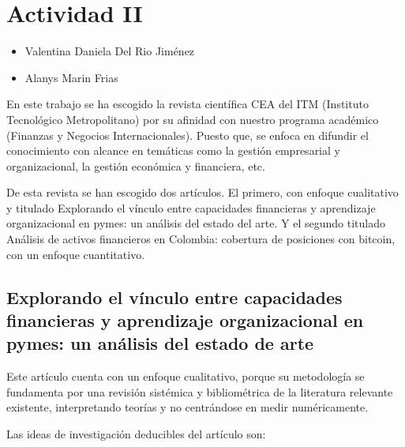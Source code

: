 \documentclass[letterpaper, 12pt]{report}
\begin{document}
\chapter*{Actividad II}

\noindent\makebox[\linewidth]{\rule{\textwidth}{0.2pt}}

\begin{itemize}[label=$\triangleright$]
      \item Valentina Daniela Del Rio Jiménez
      \item Alanys Marin Frias
\end{itemize}

\noindent\makebox[\linewidth]{\rule{\textwidth}{0.2pt}}

\nocite{*}

En este trabajo se ha escogido la revista científica CEA del ITM (Instituto
Tecnológico Metropolitano) por su afinidad con nuestro programa académico
(Finanzas y Negocios Internacionales). Puesto que, se enfoca en difundir el
conocimiento con alcance en temáticas como la gestión empresarial y
organizacional, la gestión económica y financiera, etc.

De esta revista se han escogido dos artículos. El primero, con enfoque
cualitativo y titulado Explorando el vínculo entre capacidades financieras y
aprendizaje organizacional en pymes: un análisis del estado del arte. Y el
segundo titulado Análisis de activos financieros en Colombia: cobertura de
posiciones con bitcoin, con un enfoque cuantitativo.

\section*{Explorando el vínculo entre capacidades financieras y aprendizaje organizacional en pymes: un análisis del estado de arte}

Este artículo cuenta con un enfoque cualitativo, porque su metodología se
fundamenta por una revisión sistémica y bibliométrica de la literatura
relevante existente, interpretando teorías y no centrándose en medir
numéricamente.

Las ideas de investigación deducibles del artículo son:
\end{document}
